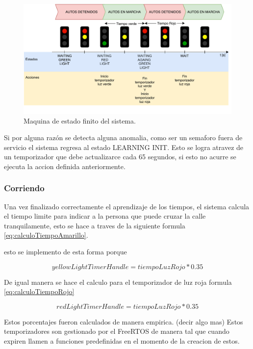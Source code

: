 \begin{figure}[h]
	\centering
	\includegraphics[scale=.7]{./Figures/digramaGraficoCambioSemaforo.pdf}
	\caption{Maquina de estado finito del sistema.}
	\label{fig:digramaGraficoCambioSemaforo}
\end{figure}

Si por alguna razón se detecta alguna anomalia, como ser un semaforo fuera de servicio el sistema regresa al estado LEARNING INIT. Esto se logra atravez de un temporizador que debe actualizarce cada 65 segundos, si esto no acurre se ejecuta la accion definida anteriormente.

\subsubsection{Corriendo}
Una vez finalizado correctamente el aprendizaje de los tiempos, el sistema calcula el tiempo limite para indicar a la persona que puede cruzar la calle tranquilamente, esto se hace a traves de la siguiente formula \ref{eq:calculoTiempoAmarillo}.

esto se implemento de esta forma porque 

\begin{equation}
\label{eq:calculoTiempoAmarillo}
yellowLightTimerHandle = tiempoLuzRojo * 0.35
\end{equation}

De igual manera se hace el calculo para el temporizador de luz roja  formula \ref{eq:calculoTiempoRojo}

\begin{equation}
\label{eq:calculoTiempoRojo}
redLightTimerHandle = tiempoLuzRojo * 0.35
\end{equation}

Estos porcentajes fueron calculados de manera empirica. (decir algo mas) 
Estos temporizadores son gestionado por el FreeRTOS de manera tal que cuando expiren llamen a funciones predefinidas en el momento de la creacion de estos.

